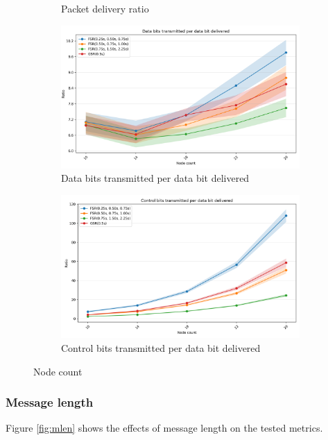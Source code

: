 \documentclass{winslabreport}
\begin{document}
\begin{figure}
\begin{subfigure}[b]{0.45\textwidth}
        \caption{Packet delivery ratio}
        \label{fig:delivery_node}
    \end{subfigure}
    \begin{subfigure}[b]{0.45\textwidth}
        \includegraphics[width=\textwidth]{../figures/nodeCount/data_bits_transmitted_per_data_bit_delivered.png}
        \caption{Data bits transmitted per data bit delivered}
        \label{fig:data_bits_node}
    \end{subfigure}
    \begin{subfigure}[b]{0.45\textwidth}
        \includegraphics[width=\textwidth]{../figures/nodeCount/control_bits_transmitted_per_data_bit_delivered.png}
        \caption{Control bits transmitted per data bit delivered}
        \label{fig:control_bits_node}
    \end{subfigure}
    \caption{Node count}
    \label{fig:node}
\end{figure}

\subsubsection{Message length}
Figure \ref{fig:mlen} shows the effects of message length on the tested metrics.
\end{document}
